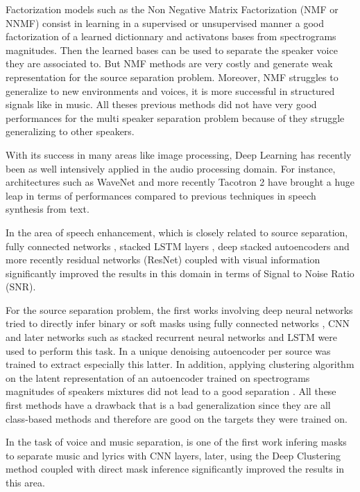 \documentclass[master,final,11pt]{iscs-thesis}
\begin{document}
Factorization models such as the Non Negative Matrix Factorization \cite{SNMF, NMFalgo} (NMF or NNMF) consist in learning in a supervised or unsupervised manner a good factorization of a learned dictionnary and activatons bases from spectrograms magnitudes. Then the learned bases can be used to separate the speaker voice they are associated to. But NMF methods are very costly and generate weak representation for the source separation problem. Moreover, NMF struggles to generalize to new environments and voices, it is more successful in structured signals like in music.
All theses previous methods did not have very good performances for the multi speaker separation problem because of they struggle generalizing to other speakers.

With its success in many areas like image processing, Deep Learning has recently been as well intensively applied in the audio processing domain. For instance, architectures such as WaveNet \cite{WaveNet} and more recently Tacotron 2 \cite{Tacotron2} have brought a huge leap in terms of performances compared to previous techniques in speech synthesis from text.

In the area of speech enhancement, which is closely related to source separation, fully connected networks \cite{DLSS}, stacked LSTM layers \cite{SELSTM, DAVSE}, deep stacked autoencoders \cite{AESE} and more recently residual networks (ResNet) coupled with visual information \cite{SpeechEnh} significantly improved the results in this domain in terms of Signal to Noise Ratio (SNR).

For the source separation problem, the first works involving deep neural networks tried to directly infer binary or soft masks using fully connected networks \cite{DNNSS, MASKDNN, MasksDNN, MASKDNN2}, CNN \cite{CNNrecog, Karaoke} and later networks such as stacked recurrent neural networks \cite{RNNSS, DNNSS2} and LSTM \cite{OverviewSSDL,LSTMSS, SpeechEnh} were used to perform this task. In \cite{AESS, AESS2} a unique  denoising autoencoder per source was trained to extract especially this latter. In addition, applying clustering algorithm on the latent representation of an autoencoder trained on spectrograms magnitudes of speakers mixtures did not lead to a good separation \cite{AESSsimple}. All these first methods have a drawback that is a bad generalization since they are all class-based  methods and therefore are good on the targets they were trained on. 

In the task of voice and music separation, \cite{Karaoke} is one of the first work infering masks to separate music and lyrics with CNN layers, later, \cite{chimera} using the Deep Clustering method coupled with direct mask inference significantly improved the results in this area.
\end{document}
